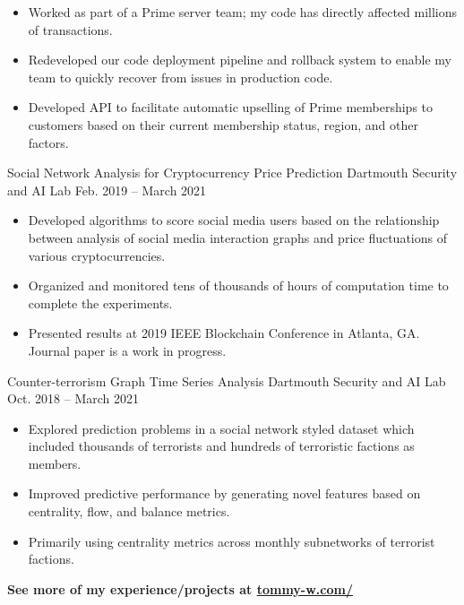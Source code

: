 \documentclass[11pt]{resume}
\begin{document}
    \begin{itemize}
        \item Worked as part of a Prime server team; my code has directly affected millions of
            transactions.
        \item Redeveloped our code deployment pipeline and rollback system to enable my team to 
            quickly recover from issues in production code.
        \item Developed API to facilitate automatic upselling of Prime memberships to customers 
            based on their current membership status, region, and other factors.
    \end{itemize}

    \medskip

    \datedentry
        {Social Network Analysis for Cryptocurrency Price Prediction}
        {Dartmouth Security and AI Lab}
        {Feb. 2019 -- March 2021}
        {}
    
    \begin{itemize}
        \item Developed algorithms to score social media users based on the relationship between 
            analysis of social media interaction graphs and price fluctuations of various 
            cryptocurrencies.
        \item Organized and monitored tens of thousands of hours of computation time to complete 
            the experiments.
        \item Presented results at 2019 IEEE Blockchain Conference in Atlanta, GA. Journal paper is
            a work in progress. 
    \end{itemize}

    \divider

    \datedentry
        {Counter-terrorism Graph Time Series Analysis}
        {Dartmouth Security and AI Lab}
        {Oct. 2018 -- March 2021}
        {}

    \begin{itemize}
        \item Explored prediction problems in a social network styled dataset which included thousands of terrorists and hundreds of 
            terroristic factions as members.
        \item Improved predictive performance by generating novel features based on centrality, flow, and balance metrics.
            \item Primarily using centrality metrics across monthly subnetworks of terrorist factions.
    \end{itemize}

    \divider

    \large\bfseries See more of my experience/projects at \href{https://tommy-w.com/}{tommy-w.com/}
\end{document}
